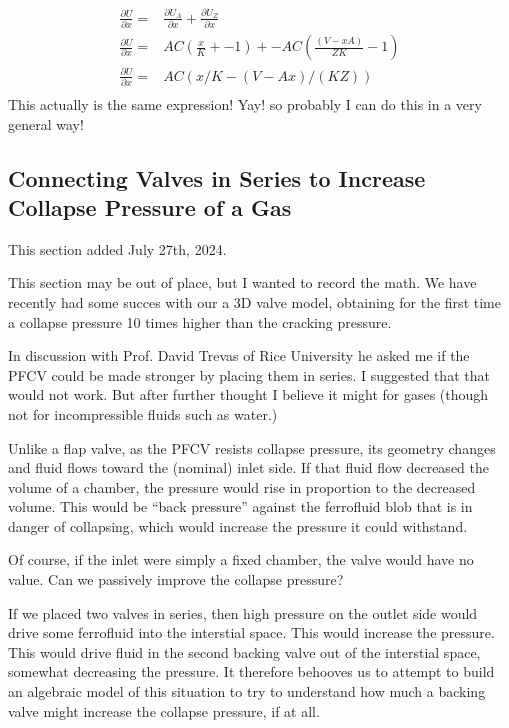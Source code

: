 \documentclass{asme2ej}
\begin{document}
\begin{align}
  \frac{\partial U}{\partial x} = & \frac{\partial U_A}{\partial x} + \frac{\partial U_Z}{\partial x}\\
  \frac{\partial U}{\partial x} = & AC(\frac{x}{K} + -1) + -A C(\frac{(V-xA)}{ZK} - 1)\\
  \frac{\partial U}{\partial x} = & A C (x/K - (V - A x)/(K Z))\\
\end{align}
This actually is the same expression! Yay!  so probably I can do this in a very general way!


\subsection{ Connecting Valves in Series to Increase Collapse Pressure of a Gas}

This section added July 27th, 2024.

This section may be out of place, but I wanted to record the math.
We have recently had some succes with our a 3D valve model, obtaining
for the first time a collapse pressure 10 times higher than the cracking
pressure.

In discussion with Prof. David Trevas of Rice University he asked me
if the PFCV could be made stronger by placing them in series.
I suggested that that would not work. But after further thought I
believe it might for gases (though not for incompressible fluids such as water.)

Unlike a flap valve, as the PFCV resists collapse pressure, its
geometry changes and fluid flows toward the (nominal) inlet side.
If that fluid flow decreased the volume of a chamber, the pressure
would rise in proportion to the decreased volume. This would be
``back pressure'' against the ferrofluid blob that is in danger
of collapsing, which would increase the pressure it could withstand.

Of course, if the inlet were simply a fixed chamber, the valve
would have no value. Can we passively improve the collapse pressure?

If we placed two valves in series, then high pressure on the outlet
side would drive some ferrofluid into the interstial space.
This would increase the pressure. This would drive fluid in the second
backing valve out
of the interstial space, somewhat decreasing the pressure.
It therefore behooves us to attempt to build an algebraic model of this
situation to try to understand how much a backing valve might
increase the collapse pressure, if at all.
\end{document}
